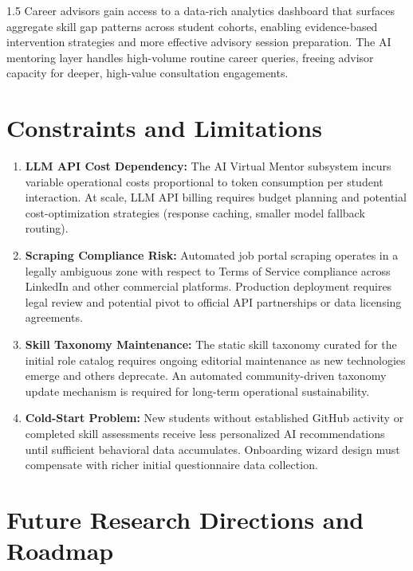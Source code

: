 \documentclass[12pt,a4paper]{report}
\begin{document}
\begin{spacing}{1.5}
		Career advisors gain access to a data-rich analytics dashboard that surfaces aggregate skill gap patterns across student cohorts, enabling evidence-based intervention strategies and more effective advisory session preparation. The AI mentoring layer handles high-volume routine career queries, freeing advisor capacity for deeper, high-value consultation engagements.
		
		\section{Constraints and Limitations}
		
		\begin{enumerate}
			\item \textbf{LLM API Cost Dependency:} The AI Virtual Mentor subsystem incurs variable operational costs proportional to token consumption per student interaction. At scale, LLM API billing requires budget planning and potential cost-optimization strategies (response caching, smaller model fallback routing).
			
			\item \textbf{Scraping Compliance Risk:} Automated job portal scraping operates in a legally ambiguous zone with respect to Terms of Service compliance across LinkedIn and other commercial platforms. Production deployment requires legal review and potential pivot to official API partnerships or data licensing agreements.
			
			\item \textbf{Skill Taxonomy Maintenance:} The static skill taxonomy curated for the initial role catalog requires ongoing editorial maintenance as new technologies emerge and others deprecate. An automated community-driven taxonomy update mechanism is required for long-term operational sustainability.
			
			\item \textbf{Cold-Start Problem:} New students without established GitHub activity or completed skill assessments receive less personalized AI recommendations until sufficient behavioral data accumulates. Onboarding wizard design must compensate with richer initial questionnaire data collection.
		\end{enumerate}
		
		\section{Future Research Directions and Roadmap}
		

\end{spacing}
\end{document}
